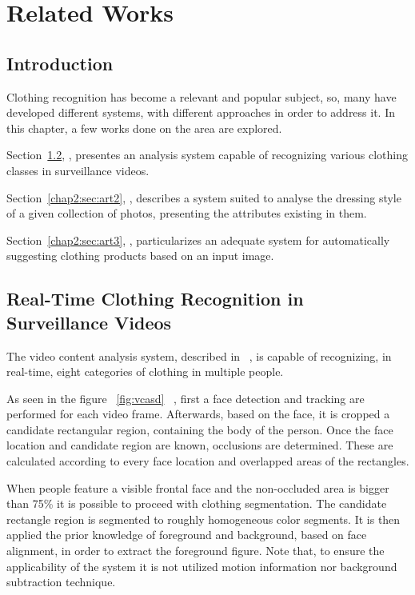 \documentclass[titlepage,12pt,a4paper,times]{book}
\begin{document}
\chapter{Related Works}
\label{chap:ow}

\section{Introduction}
\label{chap2:sec:intro}

Clothing recognition has become a relevant and popular subject, so, many have
developed different systems, with different approaches in order to address it.
In this chapter, a few works done on the area are explored.

Section~\ref{chap2:sec:art1}, , presentes an
analysis system capable of recognizing various clothing classes in surveillance
videos.

Section~\ref{chap2:sec:art2}, , describes a system
suited to analyse the dressing style of a given collection of photos,
presenting the attributes existing in them.

Section~\ref{chap2:sec:art3}, , particularizes an
adequate system for automatically suggesting clothing products based on an
input image.

\section{Real-Time Clothing Recognition in Surveillance Videos}
\label{chap2:sec:art1}

The video content analysis system, described in ~\citep{1}, is capable of
recognizing, in real-time, eight categories of clothing in multiple people.

As seen in the figure ~\ref{fig:vcasd} ~\citep{1}, first a face detection and
tracking are performed for each video frame. Afterwards, based on the face, it
is cropped a candidate rectangular region, containing the body of the person.
Once the face location and candidate region are known, occlusions are
determined. These are calculated according to every face location and
overlapped areas of the rectangles.

When people feature a visible frontal face and the non-occluded area is bigger
than 75\% it is possible to proceed with clothing segmentation. The candidate
rectangle region is segmented to roughly homogeneous color segments. It is then
applied the prior knowledge of foreground and background, based on face
alignment, in order to extract the foreground figure. Note that, to ensure the
applicability of the system it is not utilized motion information nor
background subtraction technique.
\end{document}
